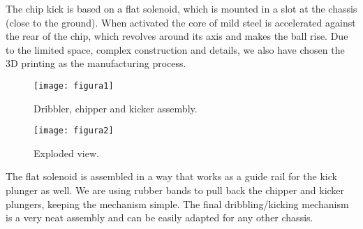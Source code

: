 The chip kick is based on a flat solenoid, which is mounted in a slot at the
chassis (close to the ground). When activated the core of mild steel is
accelerated against the rear of the chip, which revolves around its axis and
makes the ball rise. Due to the limited space, complex construction and
details, we also have chosen the 3D printing as the manufacturing process.

\begin{figure}[tbh!]
    \centering
    \texttt{[image: figura1]}
    \caption{Dribbler, chipper and kicker assembly.}
    \label{figura1}

    \texttt{[image: figura2]}
    \caption{Exploded view.}
    \label{figura2}
\end{figure}

The flat solenoid is assembled in a way that works as a guide rail for the kick
plunger as well. We are using rubber bands to pull back the chipper and kicker
plungers, keeping the mechanism simple. The final dribbling/kicking mechanism
is a very neat assembly and can be easily adapted for any other chassis.

